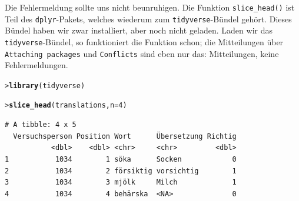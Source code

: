 \documentclass[oneside, 10pt]{book}\usepackage[]{graphicx}\usepackage[]{xcolor}
\makeatletter
\newcommand{\hlnum}[1]{\textcolor[rgb]{0.686,0.059,0.569}{#1}}%
\newcommand{\hlstd}[1]{\textcolor[rgb]{0.345,0.345,0.345}{#1}}%
\newcommand{\hlkwc}[1]{\textcolor[rgb]{0.333,0.667,0.333}{#1}}%
\newcommand{\hlkwd}[1]{\textcolor[rgb]{0.737,0.353,0.396}{\textbf{#1}}}%
\newenvironment{kframe}{%
 \def\at@end@of@kframe{}%
 \ifinner\ifhmode%
  \def\at@end@of@kframe{\end{minipage}}%
  \begin{minipage}{\columnwidth}%
 \fi\fi%
 \def\FrameCommand##1{\hskip\@totalleftmargin \hskip-\fboxsep
 \colorbox{shadecolor}{##1}\hskip-\fboxsep
     \hskip-\linewidth \hskip-\@totalleftmargin \hskip\columnwidth}%
 \MakeFramed {\advance\hsize-\width
   \@totalleftmargin\z@ \linewidth\hsize
   \@setminipage}}%
 {\par\unskip\endMakeFramed%
 \at@end@of@kframe}
\newenvironment{knitrout}{}{} %
\makeatother
\begin{document}
Die Fehlermeldung sollte uns nicht beunruhigen.
Die Funktion \texttt{slice\_head()} ist Teil des \texttt{dplyr}-Pakets,
welches wiederum zum \texttt{tidyverse}-Bündel gehört.
Dieses Bündel haben wir zwar installiert, aber noch nicht
geladen. Laden wir das \texttt{tidyverse}-Bündel,
so funktioniert die Funktion schon; die Mitteilungen
über \texttt{Attaching packages} und \texttt{Conflicts}
sind eben nur das: Mitteilungen, keine Fehlermeldungen.
\begin{knitrout}
\color{fgcolor}\begin{kframe}
\begin{alltt}
\hlstd{> }\hlkwd{library}\hlstd{(tidyverse)}
\end{alltt}


{\ttfamily\noindent\itshape\color{messagecolor}{-- Attaching packages ------------------- tidyverse 1.3.1 --}}

{\ttfamily\noindent\itshape\color{messagecolor}{v ggplot2 3.3.6 \ \ \ \ v purrr \ \ 0.3.4\\v tibble \ 3.1.7 \ \ \ \ v dplyr \ \ 1.0.9\\v tidyr \ \ 1.2.0 \ \ \ \ v stringr 1.4.0\\v readr \ \ 2.1.2 \ \ \ \ v forcats 0.5.1}}

{\ttfamily\noindent\itshape\color{messagecolor}{-- Conflicts ---------------------- tidyverse\_conflicts() --\\x dplyr::filter() masks stats::filter()\\x dplyr::lag() \ \ \ masks stats::lag()}}\end{kframe}
\end{knitrout}
\begin{knitrout}
\color{fgcolor}\begin{kframe}
\begin{alltt}
\hlstd{> }\hlkwd{slice_head}\hlstd{(translations,} \hlkwc{n} \hlstd{=} \hlnum{4}\hlstd{)}
\end{alltt}
\begin{verbatim}
# A tibble: 4 x 5
  Versuchsperson Position Wort      Übersetzung Richtig
           <dbl>    <dbl> <chr>     <chr>         <dbl>
1           1034        1 söka      Socken            0
2           1034        2 försiktig vorsichtig        1
3           1034        3 mjölk     Milch             1
4           1034        4 behärska  <NA>              0
\end{verbatim}
\end{kframe}
\end{knitrout}
\end{document}
